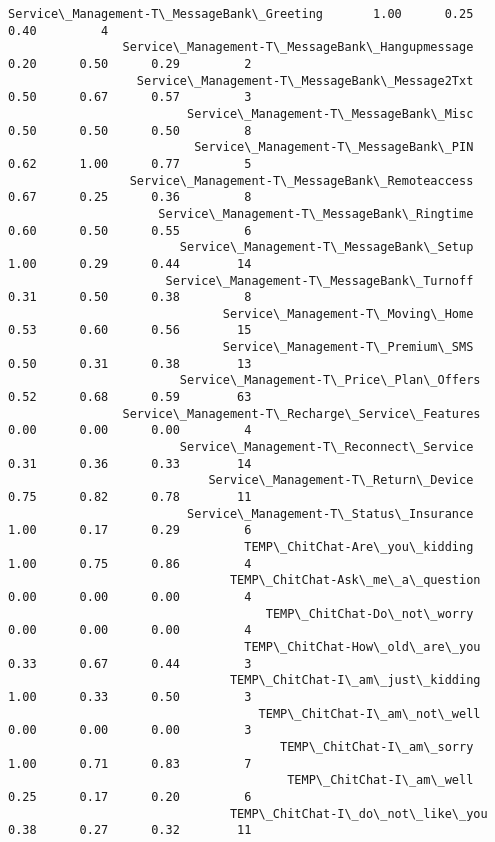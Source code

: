 \documentclass[11pt]{article}
\begin{document}
\begin{Verbatim}[commandchars=\\\{\}]
                     Service\_Management-T\_MessageBank\_Greeting       1.00      0.25      0.40         4
                Service\_Management-T\_MessageBank\_Hangupmessage       0.20      0.50      0.29         2
                  Service\_Management-T\_MessageBank\_Message2Txt       0.50      0.67      0.57         3
                         Service\_Management-T\_MessageBank\_Misc       0.50      0.50      0.50         8
                          Service\_Management-T\_MessageBank\_PIN       0.62      1.00      0.77         5
                 Service\_Management-T\_MessageBank\_Remoteaccess       0.67      0.25      0.36         8
                     Service\_Management-T\_MessageBank\_Ringtime       0.60      0.50      0.55         6
                        Service\_Management-T\_MessageBank\_Setup       1.00      0.29      0.44        14
                      Service\_Management-T\_MessageBank\_Turnoff       0.31      0.50      0.38         8
                              Service\_Management-T\_Moving\_Home       0.53      0.60      0.56        15
                              Service\_Management-T\_Premium\_SMS       0.50      0.31      0.38        13
                        Service\_Management-T\_Price\_Plan\_Offers       0.52      0.68      0.59        63
                Service\_Management-T\_Recharge\_Service\_Features       0.00      0.00      0.00         4
                        Service\_Management-T\_Reconnect\_Service       0.31      0.36      0.33        14
                            Service\_Management-T\_Return\_Device       0.75      0.82      0.78        11
                         Service\_Management-T\_Status\_Insurance       1.00      0.17      0.29         6
                                 TEMP\_ChitChat-Are\_you\_kidding       1.00      0.75      0.86         4
                               TEMP\_ChitChat-Ask\_me\_a\_question       0.00      0.00      0.00         4
                                    TEMP\_ChitChat-Do\_not\_worry       0.00      0.00      0.00         4
                                 TEMP\_ChitChat-How\_old\_are\_you       0.33      0.67      0.44         3
                               TEMP\_ChitChat-I\_am\_just\_kidding       1.00      0.33      0.50         3
                                   TEMP\_ChitChat-I\_am\_not\_well       0.00      0.00      0.00         3
                                      TEMP\_ChitChat-I\_am\_sorry       1.00      0.71      0.83         7
                                       TEMP\_ChitChat-I\_am\_well       0.25      0.17      0.20         6
                               TEMP\_ChitChat-I\_do\_not\_like\_you       0.38      0.27      0.32        11

\end{Verbatim}
\end{document}
